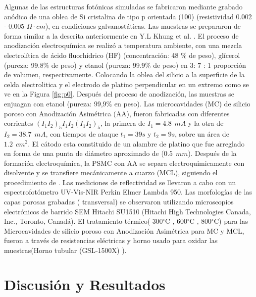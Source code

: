 \documentclass[a4paper,11pt,]{book}
\newcommand{\grad}{$^{\circ}$}
\begin{document}
Algunas de las estructuras fotónicas simuladas se fabricaron mediante grabado anódico de una oblea de Si cristalina de tipo p orientada (100) (resistividad 0.002 - 0.005 $ \Omega \cdot cm$), en condiciones galvanostáticas. Las muestras se prepararon de forma similar a la descrita anteriormente en Y.L Khung et al. \cite{Ik}. El proceso de anodización electroquímica se realizó a temperatura ambiente, con una mezcla electrolítica de ácido fluorhídrico (HF) (concentración: 48 $ \% $ de peso), glícerol (pureza: 99.8$ \% $ de peso) y etanol (pureza: 99.9$ \% $ de peso) en 3: 7 : 1 proporción de volumen, respectivamente. Colocando la oblea del silicio a la superficie de la celda electrolitica y el electrodo de platino perpendicular en un extremo como se ve en la Figura \ref{fig:p0}. Después del proceso de anodización, las muestras se enjuagan con etanol (pureza: 99,9$ \% $ en peso). Las microcavidades (MC) de silicio poroso con Anodización Asimétrica (AA), fueron fabricadas con diferentes  corrientes $(I_1I_2)_5I_1I_2(I_1I_2)_5$, la primera de $I_1=4.8 \ \  mA$ y la otra de  $I_2=38.7 \ \  mA$, con tiempos de ataque $t_1=39s$ y $t_2=9s$, sobre un área de $1.2 \ \ cm^2$. El cátodo esta constituido de un alambre de platino que fue arreglado en forma de una punta de diámetro aproximado de ($0.5\ \ mm$). Después de la formación electroquímica, la PSMC con AA se separa electroquimicamente con disolvente y se transfiere mecánicamente a cuarzo (MCL), siguiendo el procedimiento de \cite{I10L}. Las mediciones de reflectividad se llevaron a cabo con un espectrofotómetro UV-Vis-NIR Perkin Elmer Lambda 950. Las morfologías de las capas porosas grabadas ( transversal) se observaron utilizando microscopios electrónicos de barrido SEM Hitachi SU1510 (Hitachi High Technologies Canada, Inc., Toronto, Canadá).
El tratamiento térmico(  300\grad C ,  600\grad C ,  800\grad C) para las Microcavidades de silicio poroso con Anodización Asimétrica para MC y MCL,  fueron  a través de resistencias eléctricas y horno usado para oxidar las muestras(Horno tubular (GSL-1500X) ).  

\section{Discusión y Resultados}
\end{document}
